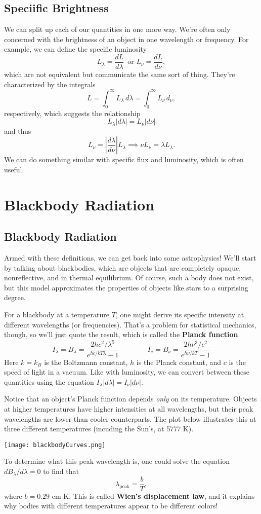 \documentclass[../a062main.tex]{subfiles}
\begin{document}
\subsection*{Speciific Brightness}
We can split up each of our quantities in one more way.
We're often only concerned with the brightness of an object in one wavelength or frequency.
For example, we can define the specific luminosity
\[ L_\lambda = \frac{dL}{d\lambda} \,\text{ or } L_\nu = \frac{dL}{d\nu}, \]
which are not equivalent but communicate the same sort of thing.
They're characterized by the integrals
\[ L = \int_{0}^{\infty} L_\lambda \,d\lambda = \int_{0}^{\infty} L_\nu \,d_\nu, \]
respectively, which suggests the relationship
\[ L_\lambda |d\lambda| = L_\nu |d\nu| \]
and thus
\[ \boxed{L_\nu = \left| \frac{d\lambda}{d\nu} \right| L_\lambda} \implies \boxed{\nu L_\nu = \lambda L_\lambda}. \]
We can do something similar with specific flux and luminosity, which is often useful.

\section{Blackbody Radiation}
\subsection*{Blackbody Radiation}
Armed with these definitions, we can get back into some astrophysics!
We'll start by talking about blackbodies, which are objects that are completely opaque, nonreflective, and in thermal equilibrium.
Of course, such a body does not exist, but this model approximates the properties of objects like stars to a surprising degree.

For a blackbody at a temperature $T$, one might derive its specific intensity at different wavelengths (or frequencies).
That's a problem for statistical mechanics, though, so we'll just quote the result, which is called the \textbf{Planck function}.
\[ \boxed{I_\lambda = B_\lambda = \frac{2hc^2 / \lambda^{5}}{e^{hc / kT\lambda} - 1} \qquad\qquad I_\nu= B_\nu = \frac{2h\nu^3 / c^2}{e^{h\nu / kT} - 1}} \]
Here $k = k_B$ is the Boltzmann constant, $h$ is the Planck constant, and $c$ is the speed of light in a vacuum.
Like with luminosity, we can convert between these quantities using the equation $I_\lambda |d\lambda| = I_\nu |d\nu|$.

Notice that an object's Planck function depends \textit{only} on its temperature.
Objects at higher temperatures have higher intensities at all wavelengths, but their peak wavelengths are lower than cooler counterparts.
The plot below illustrates this at three different temperatures (incuding the Sun's, at 5777 K).
\begin{center}
    \texttt{[image: blackbodyCurves.png]}
\end{center}
To determine what this peak wavelength is, one could solve the equation $dB_\lambda / d\lambda = 0$ to find that
\[ \boxed{\lambda_\textrm{peak} = \frac{b}{T}}, \]
where $b = 0.29 \text{ cm K}$.
This is called \textbf{Wien's displacement law}, and it explains why bodies with different temperatures appear to be different colors!
\end{document}
